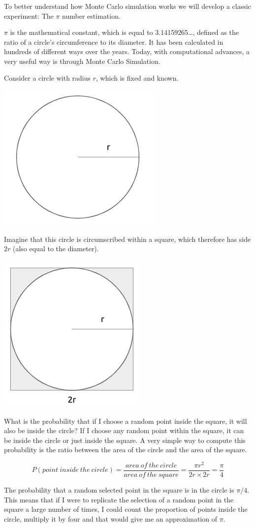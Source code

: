 \documentclass[
]{book}
\begin{document}
To better understand how Monte Carlo simulation works we will develop a classic experiment: The \(\pi\) number estimation.

\(\pi\) is the mathematical constant, which is equal to 3.14159265\ldots, defined as the ratio of a circle's circumference to its diameter. It has been calculated in hundreds of different ways over the years. Today, with computational advances, a very useful way is through Monte Carlo Simulation.

Consider a circle with radius \(r\), which is fixed and known.

\begin{center}\includegraphics[width=0.25\linewidth]{images/Circle-radio} \end{center}

Imagine that this circle is circumscribed within a square, which therefore has side \(2r\) (also equal to the diameter).

\begin{center}\includegraphics[width=0.25\linewidth]{images/Circle-square} \end{center}

What is the probability that if I choose a random point inside the square, it will also be inside the circle? If I choose any random point within the square, it can be inside the circle or just inside the square. A very simple way to compute this probability is the ratio between the area of the circle and the area of the square.

\[
P(point\ inside\ the\ circle) = \frac{area\ of\ the\ circle}{area\ of\ the\ square}=\frac{\pi r^2}{2r\times 2r}=\frac{\pi}{4}
\]

The probability that a random selected point in the square is in the circle is \(\pi/4\). This means that if I were to replicate the selection of a random point in the square a large number of times, I could count the proportion of points inside the circle, multiply it by four and that would give me an approximation of \(\pi\).
\end{document}
